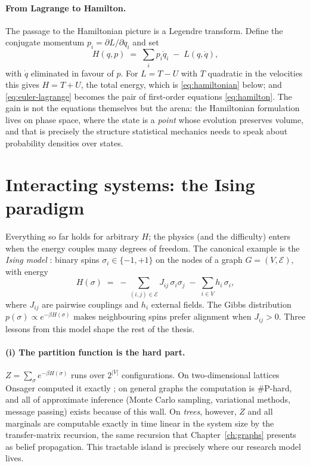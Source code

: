 \paragraph{From Lagrange to Hamilton.} The passage to the Hamiltonian
picture is a Legendre transform. Define the conjugate momentum
$p_i = \partial L/\partial \dot q_i$ and set
\begin{equation}
  H(q,p) \;=\; \sum_i p_i \dot q_i \;-\; L(q,\dot q),
  \label{eq:legendre}
\end{equation}
with $\dot q$ eliminated in favour of $p$. For $L = T - U$ with $T$ quadratic
in the velocities this gives $H = T + U$, the total energy, which is
\eqref{eq:hamiltonian} below; and \eqref{eq:euler-lagrange} becomes the pair
of first-order equations \eqref{eq:hamilton}. The gain is not the equations
themselves but the arena: the Hamiltonian formulation lives on phase space,
where the state is a \emph{point} whose evolution preserves volume, and that
is precisely the structure statistical mechanics needs to speak about
probability densities over states.

\section{Interacting systems: the Ising paradigm}\label{sec:ising}

Everything so far holds for arbitrary $H$; the physics (and the
difficulty) enters when the energy couples many degrees of freedom. The
canonical example is the \emph{Ising model} \citep{ising1925beitrag}:
binary spins $\sigma_i \in \{-1, +1\}$ on the nodes of a graph
$G = (V, \mathcal{E})$, with energy
\begin{equation}
  H(\sigma) \;=\; -\sum_{(i,j) \in \mathcal{E}} J_{ij}\, \sigma_i \sigma_j
  \;-\; \sum_{i \in V} h_i\, \sigma_i ,
  \label{eq:ising}
\end{equation}
where $J_{ij}$ are pairwise couplings and $h_i$ external fields. The
Gibbs distribution $p(\sigma) \propto e^{-\beta H(\sigma)}$ makes
neighbouring spins prefer alignment when $J_{ij} > 0$. Three lessons from
this model shape the rest of the thesis.

\paragraph{(i) The partition function is the hard part.}
$Z = \sum_\sigma e^{-\beta H(\sigma)}$ runs over $2^{|V|}$
configurations. On two-dimensional lattices Onsager computed it exactly
\citep{onsager1944crystal}; on general graphs the computation is
\#P-hard, and all of approximate inference (Monte Carlo sampling,
variational methods, message passing) exists because of this wall. On
\emph{trees}, however, $Z$ and all marginals are computable exactly in
time linear in the system size by the transfer-matrix recursion, the same
recursion that Chapter~\ref{ch:graphs} presents as belief propagation.
This tractable island is precisely where our research model lives.

